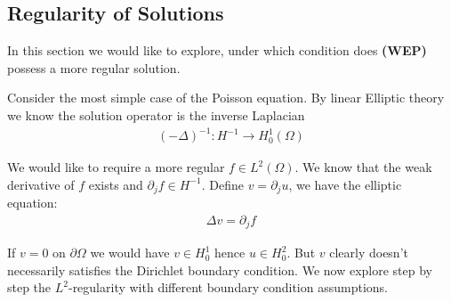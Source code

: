 \subsection{Regularity of Solutions}
In this section we would like to explore, under which condition does \textbf{(WEP)} possess a more regular solution. \par 
Consider the most simple case of the Poisson equation. By linear Elliptic theory we know the solution operator is the inverse Laplacian 
\begin{align*}
	(-\Delta)^{-1}: H^{-1} \rightarrow H_0^1(\Omega)
\end{align*}

We would like to require a more regular $ f \in L^2(\Omega)$. We know that the weak derivative of $f$ exists and $\partial_j f \in H^{-1}$. Define $v = \partial_j u$, we have the elliptic equation:
\begin{align*}
	\Delta v = \partial_j f
\end{align*} 

If $v = 0$ on $\partial\Omega$ we would have $v \in H_0^1$ hence $u \in H^2_0$. But $v$ clearly doesn't necessarily satisfies the Dirichlet boundary condition. We now explore step by step the $L^2$-regularity with different boundary condition assumptions.\par


